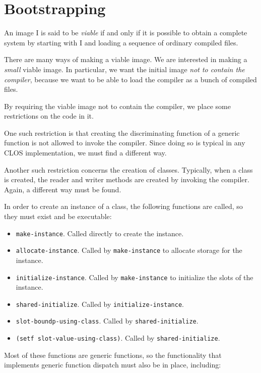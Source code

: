 \chapter{Bootstrapping}

An image I is said to be \emph{viable} if and only if it is possible
to obtain a complete \cl{} system by starting with I and loading a
sequence of ordinary compiled files.

There are many ways of making a viable image.  We are interested in
making a \emph{small} viable image.  In particular, we want the
initial image \emph{not to contain the compiler}, because we want to
be able to load the compiler as a bunch of compiled files. 

By requiring the viable image not to contain the compiler, we place
some restrictions on the code in it.  

One such restriction is that creating the discriminating function of a
generic function is not allowed to invoke the compiler.  Since doing
so is typical in any CLOS implementation, we must find a different
way.

Another such restriction concerns the creation of classes.  Typically,
when a class is created, the reader and writer methods are created by
invoking the compiler.  Again, a different way must be found.

In order to create an instance of a class, the following functions
are called, so they must exist and be executable:

\begin{itemize}
\item \texttt{make-instance}.  Called directly to create the instance.
\item \texttt{allocate-instance}.  Called by \texttt{make-instance} to
  allocate storage for the instance.
\item \texttt{initialize-instance}.  Called by \texttt{make-instance}
  to initialize the slots of the instance.
\item \texttt{shared-initialize}.  Called by
  \texttt{initialize-instance}.
\item \texttt{slot-boundp-using-class}.  Called by \texttt{shared-initialize}.
\item \texttt{(setf slot-value-using-class)}.  Called by
  \texttt{shared-initialize}.
\end{itemize}

Most of these functions are generic functions, so the functionality
that implements generic function dispatch must also be in place,
including:

